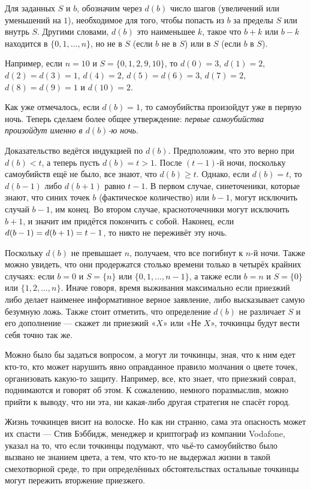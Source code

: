 Для заданных $S$ и $b$, обозначим через $d(b)$ число шагов (увеличений или уменьшений на $1$), необходимое для того, чтобы попасть из $b$ за пределы $S$ или внутрь $S$.
Другими словами, $d(b)$ это наименьшее $k$, такое что $b+k$ или $b-k$ находится в $\{0, 1, \dots, n\}$, но не в $S$ (если $b$ не в  $S$) или в $S$ (если $b$ в $S$).

Например, если $n=10$ и 
$S=\{0,1,2,9,10\}$, то 
$d(0)=3$, 
$d(1)=2$, 
$d(2)=d(3)=1$, 
$d(4)=2$, 
$d(5)=d(6)=3$, 
$d(7)=2$, 
$d(8)=d(9)=1$ и
$d(10)=2$.

Как уже отмечалось, если $d(b)=1$, то самоубийства произойдут уже в первую ночь.
Теперь сделаем более общее утверждение: \emph{первые самоубийства произойдут именно в $d(b)$-ю ночь}.

Доказательство ведётся индукцией по $d(b)$.
Предположим, что это верно при $d(b)<t$, а теперь пусть $d(b)=t>1$.
После $(t-1)$-й ночи, поскольку самоубийств ещё не было, все знают, что $d(b)\ge t$.
Однако, если $d(b)=t$, то $d(b-1)$ либо $d(b+1)$ равно $t-1$.
В первом случае, синеточеники, которые знают, что синих точек $b$ (фактическое количество) или $b-1$, 
могут исключить случай $b-1$, им конец.
Во втором случае, красноточечники могут исключить $b+1$, и значит им придётся покончить с собой.
Наконец, если $d(b-1)\z=d(b+1)=t-1$, то никто не переживёт эту ночь.

Поскольку $d(b)$ не превышает $n$, получаем, что все погибнут к $n$-й ночи.
Также можно увидеть, что они продержатся столько времени только в четырёх крайних случаях:
если $b=0$ и $S=\{n\}$ или $\{0,1,\dots,n-1\}$,
а также если $b=n$ и $S=\{0\}$ или $\{1,2,\dots,n\}$.
Иначе говоря, время выживания максимально если приезжий либо делает наименее информативное верное заявление,
либо высказывает самую безумную ложь.
Также стоит отметить, что определение $d(b)$ не различает 
$S$ и его дополнение --- скажет ли приезжий «$X$» или «Не $X$», точкинцы будут вести себя точно так же.

Можно было бы задаться вопросом, а могут ли точкинцы, зная, что к ним едет кто-то, кто может нарушить явно оправданное правило молчания о цвете точек, организовать какую-то защиту.
Например, все, кто знает, что приезжий соврал, поднимаются и говорят об этом.
К сожалению, немного поразмыслив, можно прийти к выводу, что ни эта, ни какая-либо другая стратегия не спасёт город.

Жизнь точкинцев висит на волоске.
Но как ни странно, сама эта опасность может их спасти --- Стив Бэббидж, менеджер и криптограф из компании Vodafone, указал на то, что если точкинцы подумают, что чьё-то самоубийство было вызвано не знанием цвета, а тем, что кто-то не выдержал жизни в такой смехотворной среде, то при определённых обстоятельствах остальные точкинцы могут пережить вторжение приезжего.


